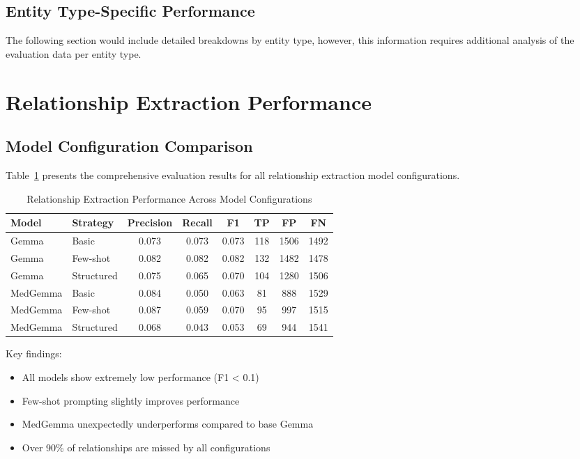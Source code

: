 \subsection{Entity Type-Specific Performance}

The following section would include detailed breakdowns by entity type, however, this information requires additional analysis of the evaluation data per entity type.

\section{Relationship Extraction Performance}

\subsection{Model Configuration Comparison}

Table~\ref{tab:relation-extraction} presents the comprehensive evaluation results for all relationship extraction model configurations.

\begin{table}[htbp]
\centering
\caption{Relationship Extraction Performance Across Model Configurations}
\label{tab:relation-extraction}
\begin{tabular}{llcccccc}
\toprule
\textbf{Model} & \textbf{Strategy} & \textbf{Precision} & \textbf{Recall} & \textbf{F1} & \textbf{TP} & \textbf{FP} & \textbf{FN} \\
\midrule
Gemma & Basic & 0.073 & 0.073 & 0.073 & 118 & 1506 & 1492 \\
Gemma & Few-shot & 0.082 & 0.082 & 0.082 & 132 & 1482 & 1478 \\
Gemma & Structured & 0.075 & 0.065 & 0.070 & 104 & 1280 & 1506 \\
MedGemma & Basic & 0.084 & 0.050 & 0.063 & 81 & 888 & 1529 \\
MedGemma & Few-shot & 0.087 & 0.059 & 0.070 & 95 & 997 & 1515 \\
MedGemma & Structured & 0.068 & 0.043 & 0.053 & 69 & 944 & 1541 \\
\bottomrule
\end{tabular}
\end{table}

Key findings:
\begin{itemize}
    \item All models show extremely low performance (F1 < 0.1)
    \item Few-shot prompting slightly improves performance
    \item MedGemma unexpectedly underperforms compared to base Gemma
    \item Over 90\% of relationships are missed by all configurations
\end{itemize}

